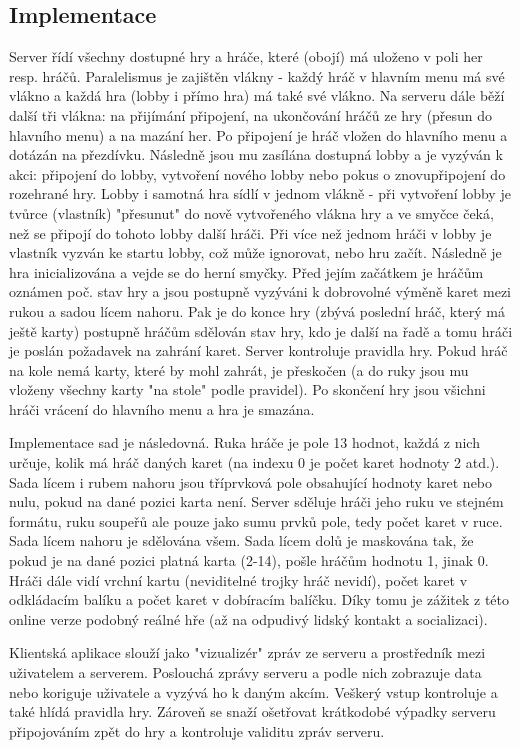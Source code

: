 \documentclass{article}
\begin{document}
\subsection{Implementace}
Server řídí všechny dostupné hry a hráče, které (obojí) má uloženo v poli her resp. hráčů. Paralelismus je zajištěn vlákny - každý hráč v hlavním menu má své vlákno a každá hra (lobby i přímo hra) má také své vlákno. Na serveru dále běží další tři vlákna: na přijímání připojení, na ukončování hráčů ze hry (přesun do hlavního menu) a na mazání her. Po připojení je hráč vložen do hlavního menu a dotázán na přezdívku. Následně jsou mu zasílána dostupná lobby a je vyzýván k akci: připojení do lobby, vytvoření nového lobby nebo pokus o znovupřipojení do rozehrané hry. Lobby i samotná hra sídlí v jednom vlákně - při vytvoření lobby je tvůrce (vlastník) "přesunut" do nově vytvořeného vlákna hry a ve smyčce čeká, než se připojí do tohoto lobby další hráči. Při více než jednom hráči v lobby je vlastník vyzván ke startu lobby, což může ignorovat, nebo hru začít. Následně je hra inicializována a vejde se do herní smyčky. Před jejím začátkem je hráčům oznámen poč. stav hry a jsou postupně vyzýváni k dobrovolné výměně karet mezi rukou a sadou lícem nahoru. Pak je do konce hry (zbývá poslední hráč, který má ještě karty) postupně hráčům sdělován stav hry, kdo je další na řadě a tomu hráči je poslán požadavek na zahrání karet. Server kontroluje pravidla hry. Pokud hráč na kole nemá karty, které by mohl zahrát, je přeskočen (a do ruky jsou mu vloženy všechny karty "na stole" podle pravidel). Po skončení hry jsou všichni hráči vrácení do hlavního menu a hra je smazána.

Implementace sad je následovná. Ruka hráče je pole 13 hodnot, každá z nich určuje, kolik má hráč daných karet (na indexu 0 je počet karet hodnoty 2 atd.). Sada lícem i rubem nahoru jsou tříprvková pole obsahující hodnoty karet nebo nulu, pokud na dané pozici karta není. Server sděluje hráči jeho ruku ve stejném formátu, ruku soupeřů ale pouze jako sumu prvků pole, tedy počet karet v ruce. Sada lícem nahoru je sdělována všem. Sada lícem dolů je maskována tak, že pokud je na dané pozici platná karta (2-14), pošle hráčům hodnotu 1, jinak 0. Hráči dále vidí vrchní kartu (neviditelné trojky hráč nevidí), počet karet v odkládacím balíku a počet karet v dobíracím balíčku. Díky tomu je zážitek z této online verze podobný reálné hře (až na odpudivý lidský kontakt a socializaci).

Klientská aplikace slouží jako "vizualizér" zpráv ze serveru a prostředník mezi uživatelem a serverem. Poslouchá zprávy serveru a podle nich zobrazuje data nebo koriguje uživatele a vyzývá ho k daným akcím. Veškerý vstup kontroluje a také hlídá pravidla hry. Zároveň se snaží ošetřovat krátkodobé výpadky serveru připojováním zpět do hry a kontroluje validitu zpráv serveru.
\end{document}
